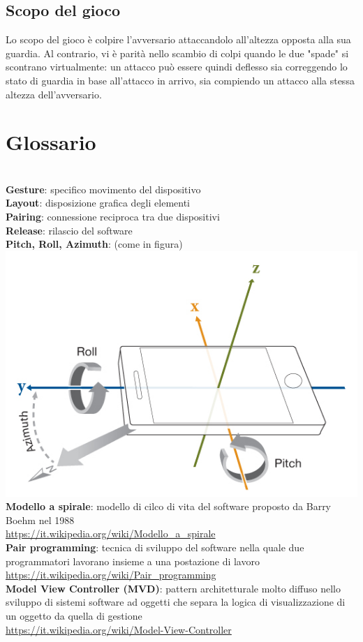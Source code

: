\documentclass[a4paper,11pt]{article}
\begin{document}
\subsection{Scopo del gioco}
Lo scopo del gioco è colpire l'avversario attaccandolo all'altezza opposta alla sua guardia.
Al contrario, vi è parità nello scambio di colpi quando le due "spade" si scontrano virtualmente: un attacco può essere quindi deflesso sia correggendo lo stato di guardia in base all'attacco in arrivo, sia compiendo un attacco alla stessa altezza dell'avversario.
\newpage

\renewcommand\thesection{}
\section{Glossario}
\ \\
\textbf{Gesture}: specifico movimento del dispositivo\\ \label{gesture}\textbf{Layout}: disposizione grafica degli elementi\\ \label{layout}\textbf{Pairing}: connessione reciproca tra due dispositivi\\ \label{pairing}\textbf{Release}: rilascio del software\\ \label{release}\textbf{Pitch, Roll, Azimuth}: (come in figura)\\\includegraphics[scale=0.5]{PitchRollAzimuth}\\ \label{pra}\textbf{Modello a spirale}: modello di cilco di vita del software proposto da Barry Boehm nel 1988 \\ \label{spirale}\url{https://it.wikipedia.org/wiki/Modello_a_spirale}\\\textbf{Pair programming}: tecnica di sviluppo del software nella quale due programmatori lavorano insieme a una postazione di lavoro \\ \label{pairp}\url{https://it.wikipedia.org/wiki/Pair_programming}\\\textbf{Model View Controller (MVD)}: pattern architetturale molto diffuso nello sviluppo di sistemi software ad oggetti che separa la logica di visualizzazione di un oggetto da quella di gestione\\ \label{MVC}\url{https://it.wikipedia.org/wiki/Model-View-Controller}
\end{document}
